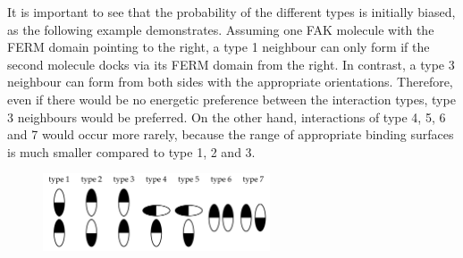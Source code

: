 It is important to see that the probability of the different types is initially biased, as the following example demonstrates. Assuming one FAK molecule with the FERM domain pointing to the right, a type 1 neighbour can only form if the second molecule docks via its FERM domain from the right. In contrast, a type 3 neighbour can form from both sides with the appropriate orientations. Therefore, even if there would be no energetic preference between the interaction types, type 3 neighbours would be preferred. On the other hand, interactions of type 4, 5, 6 and 7 would occur more rarely, because the range of appropriate binding surfaces is much smaller compared to type 1, 2 and 3.
%
%
%
\begin{figure}
	\centering
	\includegraphics[width=0.6\textwidth]{figures/introduction/classification}
	\label{methods:inttypes}
\end{figure}
%
%
%